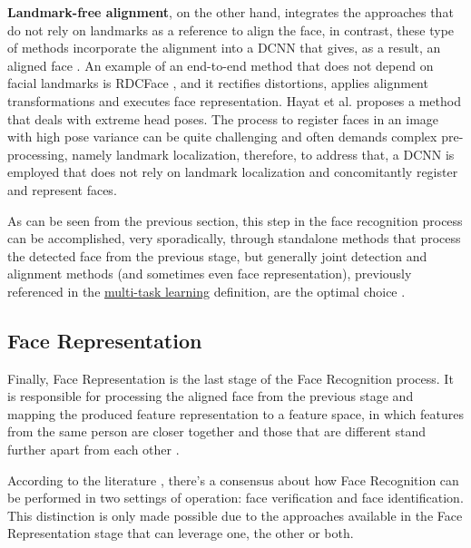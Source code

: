 \documentclass[class=report, crop=false, a4paper, 12pt]{standalone}
\begin{document}
\vspace{0.7\baselineskip}
\par \noindent \textbf{Landmark-free alignment}, on the other hand, integrates the approaches that do not rely on landmarks as a reference to align the face, in contrast, these type of methods incorporate the alignment into a DCNN that gives, as a result, an aligned face \autocite{duElementsEndtoendDeep2022}. An example of an end-to-end method that does not depend on facial landmarks is RDCFace \autocite{zhaoRDCFaceRadialDistortion2020}, and it rectifies distortions, applies alignment transformations and executes face representation. Hayat et al. \autocite{hayatJointRegistrationRepresentation2017} proposes a method that deals with extreme head poses. The process to register faces in an image with high pose variance can be quite challenging and often demands complex pre-processing, namely landmark localization, therefore, to address that, a DCNN is employed that does not rely on landmark localization and concomitantly register and represent faces.


\vspace{0.7\baselineskip}
\par As can be seen from the previous section, this step in the face recognition process can be accomplished, very sporadically, through standalone methods that process the detected face from the previous stage, but generally joint detection and alignment methods (and sometimes even face representation), previously referenced in the \hyperref[mt learning]{multi-task learning} definition, are the optimal choice \autocite{changFacePoseNetMakingCase2017}.

\subsection{Face Representation}
\par Finally, Face Representation is the last stage of the Face Recognition process. It is responsible for processing the aligned face from the previous stage and mapping the produced feature representation to a feature space, in which features from the same person are closer together and those that are different stand further apart from each other \autocite{duElementsEndtoendDeep2022}.
\par According to the literature \autocite{duElementsEndtoendDeep2022,liHandbookFaceRecognition2011,ranjanDeepLearningUnderstanding2018,schroffFaceNetUnifiedEmbedding2015,wangDeepFaceRecognition2021}, there's a consensus about how Face Recognition can be performed in two settings of operation: face verification and face identification. This distinction is only made possible due to the approaches available in the Face Representation stage that can leverage one, the other or both. 
\end{document}
